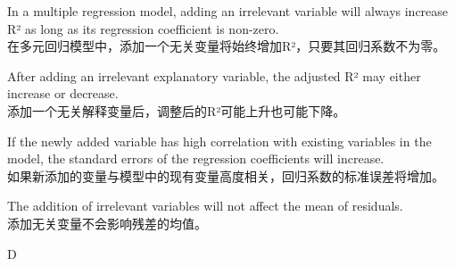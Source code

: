 \documentclass{article}
\begin{document}
\begin{choices}
    \item In a multiple regression model, adding an irrelevant variable will always increase R² as long as its regression coefficient is non-zero.\\
    在多元回归模型中，添加一个无关变量将始终增加R²，只要其回归系数不为零。
    \item After adding an irrelevant explanatory variable, the adjusted R² may either increase or decrease.\\
    添加一个无关解释变量后，调整后的R²可能上升也可能下降。
    \item If the newly added variable has high correlation with existing variables in the model, the standard errors of the regression coefficients will increase.\\
    如果新添加的变量与模型中的现有变量高度相关，回归系数的标准误差将增加。
    \item The addition of irrelevant variables will not affect the mean of residuals.\\
    添加无关变量不会影响残差的均值。
\end{choices}

\begin{correctanswer}
D
\end{correctanswer}
\end{document}
